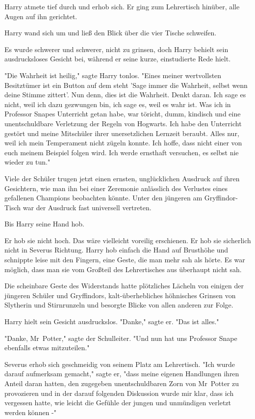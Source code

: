 {Harry atmete tief durch und erhob sich. Er ging zum Lehrertisch hinüber, alle Augen auf ihn gerichtet.

Harry wand sich um und ließ den Blick über die vier Tische schweifen.

Es wurde schwerer und schwerer, nicht zu grinsen, doch Harry behielt sein ausdrucksloses Gesicht bei, während er seine kurze, einstudierte Rede hielt.

"Die Wahrheit ist heilig," sagte Harry tonlos. "Eines meiner wertvollsten Besitztümer ist ein Button auf dem steht 'Sage immer die Wahrheit, selbst wenn deine Stimme zittert'. Nun denn, dies ist die Wahrheit. Denkt daran. Ich sage es nicht, weil ich dazu gezwungen bin, ich sage es, weil es wahr ist. Was ich in Professor Snapes Unterricht getan habe, war töricht, dumm, kindisch und eine unentschuldbare Verletzung der Regeln von Hogwarts. Ich habe den Unterricht gestört und meine Mitschüler ihrer unersetzlichen Lernzeit beraubt. Alles nur, weil ich mein Temperament nicht zügeln konnte. Ich hoffe, dass nicht einer von euch meinem Beispiel folgen wird. Ich werde ernsthaft versuchen, es selbst nie wieder zu tun."

Viele der Schüler trugen jetzt einen ernsten, unglücklichen Ausdruck auf ihren Gesichtern, wie man ihn bei einer Zeremonie anlässlich des Verlustes eines gefallenen Champions beobachten könnte. Unter den jüngeren am Gryffindor-Tisch war der Ausdruck fast universell vertreten.

Bis Harry seine Hand hob.

Er hob sie nicht hoch. Das wäre vielleicht voreilig erschienen. Er hob sie sicherlich nicht in Severus Richtung. Harry hob einfach die Hand auf Brusthöhe und schnippte leise mit den Fingern, eine Geste, die man mehr sah als hörte. Es war möglich, dass man sie vom Großteil des Lehrertisches aus überhaupt nicht sah.

Die scheinbare Geste des Widerstands hatte plötzliches Lächeln von einigen der jüngeren Schüler und Gryffindors, kalt-überhebliches höhnisches Grinsen von Slytherin und Stirnrunzeln und besorgte Blicke von allen anderen zur Folge.

Harry hielt sein Gesicht ausdruckslos. "Danke," sagte er. "Das ist alles."

"Danke, Mr~Potter," sagte der Schulleiter. "Und nun hat uns Professor Snape ebenfalls etwas mitzuteilen."

Severus erhob sich geschmeidig von seinem Platz am Lehrertisch. "Ich wurde darauf aufmerksam gemacht," sagte er, "dass meine eigenen Handlungen ihren Anteil daran hatten, den zugegeben unentschuldbaren Zorn von Mr~Potter zu provozieren und in der darauf folgenden Diskussion wurde mir klar, dass ich vergessen hatte, wie leicht die Gefühle der jungen und unmündigen verletzt werden können -"

}
